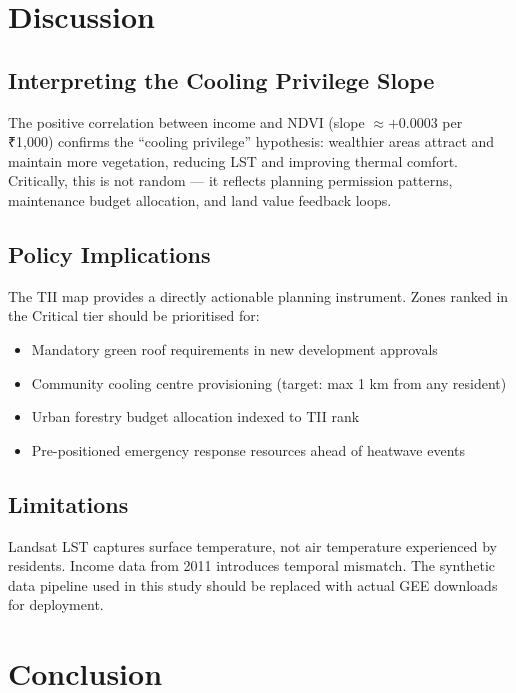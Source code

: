 \documentclass[12pt, a4paper]{article}
\begin{document}
\section{Discussion}

\subsection{Interpreting the Cooling Privilege Slope}

The positive correlation between income and NDVI (slope $\approx +0.0003$
per ₹1,000) confirms the ``cooling privilege'' hypothesis: wealthier areas
attract and maintain more vegetation, reducing LST and improving thermal
comfort. Critically, this is not random — it reflects planning permission
patterns, maintenance budget allocation, and land value feedback loops.

\subsection{Policy Implications}

The TII map provides a directly actionable planning instrument. Zones ranked
in the Critical tier should be prioritised for:
\begin{itemize}
  \item Mandatory green roof requirements in new development approvals
  \item Community cooling centre provisioning (target: max 1 km from any resident)
  \item Urban forestry budget allocation indexed to TII rank
  \item Pre-positioned emergency response resources ahead of heatwave events
\end{itemize}

\subsection{Limitations}

Landsat LST captures surface temperature, not air temperature experienced by
residents. Income data from 2011 introduces temporal mismatch. The synthetic
data pipeline used in this study should be replaced with actual GEE downloads
for deployment.

\section{Conclusion}
\end{document}
